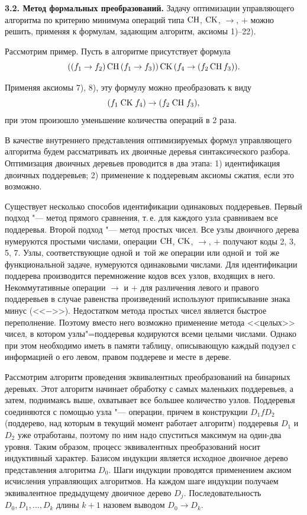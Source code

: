 \textbf{3.2. Метод формальных преобразований.} Задачу оптимизации
управляющего алгоритма по критерию минимума операций типа ${\rm CH}$, ${\rm CK}$, $\to$, $+$
 можно решить,  применяя к формулам,  задающим алгоритм,  аксиомы 1)--22).

Рассмотрим пример. Пусть в алгоритме присутствует формула
\[
((f_1 \to  f_2 )\,{\rm CH}\,(f_1 \to  f_3 ))\,{\rm CK}\,(f_4 \to  (f_2 \,{\rm CH}\,f_3 )).
\]

Применяя аксиомы 7), 8), эту  формулу можно преобразовать к виду $$(f_1 \;{\rm CK}\;f_4
)\to  (f_2 \;{\rm CH}\;f_3 ),$$  при этом произошло уменьшение количества операций в
2 раза.

В качестве внутреннего представления оптимизируемых формул управляющего
алгоритма будем рассматривать их двоичные деревья синтаксического разбора.
Оптимизация двоичных деревьев проводится в два этапа: 1) идентификация
двоичных поддеревьев; 2) применение к поддеревьям аксиомы сжатия,  если это
возможно.

Существует несколько способов идентификации одинаковых поддеревьев. Первый
подход "--- метод прямого сравнения,  т.\,е. для каждого узла сравниваем все
поддеревья.
Второй подход "--- метод простых чисел.
Все узлы двоичного дерева
нумеруются простыми числами,  операции ${\rm CH}$, ${\rm CK}$, $\to$, $+$ получают коды 2,
3,  5,  7.
Узлы,  соответствующие одной и~той же операции или одной и~той же
функциональной задаче, нумеруются одинаковыми числами.
Для идентификации поддерева производится перемножение кодов всех узлов,
входящих в него.
Некоммутативные операции $\to  $ и $+$ для различения левого и правого
поддеревьев в случае равенства произведений используют приписывание знака
минус (<<$-$>>).
Недостатком метода простых чисел является быстрое
переполнение. Поэтому вместо него возможно применение метода <<целых>>
чисел,  в котором узлы"=поддеревья кодируются всеми целыми числами.
Однако при
этом необходимо иметь в памяти таблицу,  описывающую каждый подузел с
информацией о его левом,  правом поддереве и месте в дереве.

Рассмотрим алгоритм проведения эквивалентных преобразований на бинарных
деревьях. Этот алгоритм начинает обработку с самых маленьких поддеревьев,  а
затем,  поднимаясь выше,  охватывает все большее количество узлов. Поддеревья
соединяются с помощью узла "--- операции,  причем в конструкции $D_1 f D_2
$(поддерево,  над которым в текущий момент работает алгоритм) поддеревья $D_1
$ и $D_2 $ уже отработаны,  поэтому по ним надо спуститься максимум на
один-два уровня. Таким образом,  процесс эквивалентных преобразований носит
индуктивный характер. Базисом индукции является исходное двоичное дерево
представления алгоритма $D_0 $. Шаги индукции проводятся применением аксиом
исчисления управляющих алгоритмов. На каждом шаге индукции получаем
эквивалентное предыдущему двоичное дерево $D_j $. Последовательность
$D_0, D_1, \dots, D_k $ длины $k+1$ назовем выводом $D_0 \to  D_k $.

